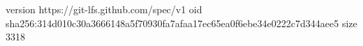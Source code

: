 version https://git-lfs.github.com/spec/v1
oid sha256:314d010c30a3666148a5f70930fa7afaa17ec65ea0f6ebe34e0222c7d344aee5
size 3318
